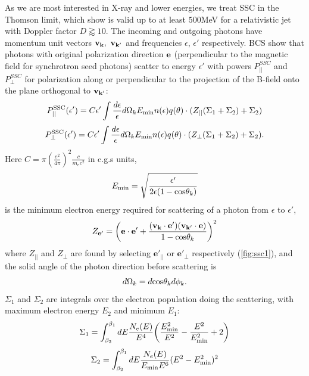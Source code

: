 As we are most interested in X-ray and lower energies, we treat SSC in the Thomson limit, which \citet{zhang_x-ray_2013} show is valid up to at least $500$MeV for a relativistic jet with Doppler factor $D \gtrapprox 10$. The incoming and outgoing photons have momentum unit vectors $\bf{v_k},\bf{~v_{k'}}$ and frequencies $\epsilon$, $\epsilon'$ respectively. BCS show that photons with original polarization direction $\bf{e}$ (perpendicular to the magnetic field for synchrotron seed photons) scatter to energy $\epsilon'$ with powers $P^{SSC}_{||}$ and $P^{SSC}_{\perp}$ for polarization along or perpendicular to the projection of the B-field onto the plane orthogonal to $\bf{v_{k'}}$:
\begin{equation}
    P^{\rm SSC}_{||}(\epsilon') = C\epsilon'\int\frac{d\epsilon}{\epsilon}d\Omega_kE_{\rm min}n(\epsilon)q(\theta) \cdot (Z_{||}(\Sigma_1 + \Sigma_2) + \Sigma_2)
\end{equation}
\begin{equation}
    P^{\rm SSC}_{\perp}(\epsilon') = C\epsilon'\int\frac{d\epsilon}{\epsilon}d\Omega_kE_{\rm min}n(\epsilon)q(\theta) \cdot (Z_{\perp}(\Sigma_1 + \Sigma_2) + \Sigma_2).
\end{equation}
Here $C = \pi (\frac{e^2}{4\pi})^2\frac{c}{m_ec^2}$ in c.g.s units,
\begin{equation}
    E_{\rm min} = \sqrt{\frac{\epsilon'}{2\epsilon(1-{\rm cos}\theta_k)}}
\end{equation}
is the minimum electron energy required for scattering of a photon from $\epsilon$ to $\epsilon'$,
\begin{equation}
    Z_{\bf{e'}} = \bigg(\mathbf{e \cdot e'} + \frac{(\mathbf{v_k \cdot e'})(\mathbf{v_{k'} \cdot e})}{1-{\rm cos}\theta_k}\bigg)^2
\end{equation}
where $Z_{||}$ and $Z_{\perp}$ are found by selecting $\mathbf{e'}_{||}$ or $\mathbf{e'}_{\perp}$ respectively (\cref{fig:ssc1}), and the solid angle of the photon direction before scattering is
\begin{equation}
    d\Omega_{k} = d{\rm cos}\theta_kd\phi_k.
\end{equation}
$\Sigma_1$ and $\Sigma_2$ are integrals over the electron population doing the scattering, with maximum electron energy $E_2$ and minimum $E_1$:
\begin{equation}
    \Sigma_1 = \int^{\beta_1}_{\beta_2}dE\frac{N_e(E)}{E^4}\bigg(\frac{E_{\rm min}^2}{E^2} - \frac{E^2}{E_{\rm min}^2} + 2\bigg)
\end{equation}
\begin{equation}
    \Sigma_2 = \int^{\beta_1}_{\beta_2}dE \frac{N_e(E)}{E_{\rm min}E^6}(E^2 - E_{\rm min}^2)^2
\end{equation}
